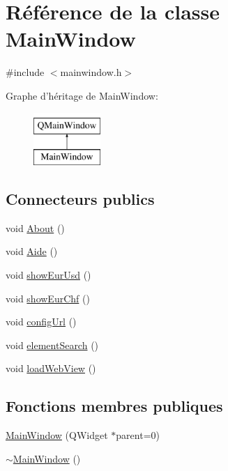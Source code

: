\hypertarget{class_main_window}{\section{Référence de la classe Main\-Window}
\label{class_main_window}
}


{\ttfamily \#include $<$mainwindow.\-h$>$}

Graphe d'héritage de Main\-Window\-:\begin{figure}[H]
\begin{center}
\leavevmode
\includegraphics[height=2.000000cm]{class_main_window}
\end{center}
\end{figure}
\subsection*{Connecteurs publics}
\begin{DoxyCompactItemize}
\item 
void \hyperlink{class_main_window_acb789dac6a35383ad1d7bb6f652c7cee}{About} ()
\item 
void \hyperlink{class_main_window_a60313e11853d62369dd7f48c36867733}{Aide} ()
\item 
void \hyperlink{class_main_window_af71514a6d74571f32a45fa79ddd7d291}{show\-Eur\-Usd} ()
\item 
void \hyperlink{class_main_window_a3350e0511efc29d592d876a7298123c7}{show\-Eur\-Chf} ()
\item 
void \hyperlink{class_main_window_a80a42469b3b6fc9548123fdcb9c400db}{config\-Url} ()
\item 
void \hyperlink{class_main_window_adddc34c97edbe78434e600cdb076ebc7}{element\-Search} ()
\item 
void \hyperlink{class_main_window_a479a75cb750744fa76646781b6a96f79}{load\-Web\-View} ()
\end{DoxyCompactItemize}
\subsection*{Fonctions membres publiques}
\begin{DoxyCompactItemize}
\item 
\hyperlink{class_main_window_a8b244be8b7b7db1b08de2a2acb9409db}{Main\-Window} (Q\-Widget $\ast$parent=0)
\item 
\hyperlink{class_main_window_ae98d00a93bc118200eeef9f9bba1dba7}{$\sim$\-Main\-Window} ()
\end{DoxyCompactItemize}


